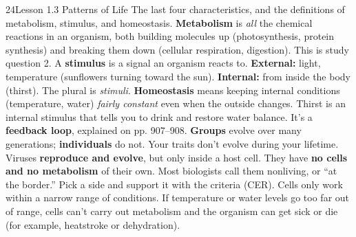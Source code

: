 \documentclass[11pt,letterpaper]{article}
\begin{document}
\begin{tbpage}{24}{Lesson 1.3 Patterns of Life}
  {The last four characteristics, and the definitions of metabolism, stimulus, and homeostasis.}
    {\textbf{Metabolism} is \emph{all} the chemical reactions in an organism, both building molecules up (photosynthesis, protein synthesis) and breaking them down (cellular respiration, digestion). This is study question 2.}
    {A \textbf{stimulus} is a signal an organism reacts to. \textbf{External:} light, temperature (sunflowers turning toward the sun). \textbf{Internal:} from inside the body (thirst). The plural is \emph{stimuli}.}
    {\textbf{Homeostasis} means keeping internal conditions (temperature, water) \emph{fairly constant} even when the outside changes. Thirst is an internal stimulus that tells you to drink and restore water balance. It's a \textbf{feedback loop}, explained on pp. 907–908.}
    {\textbf{Groups} evolve over many generations; \textbf{individuals} do not. Your traits don't evolve during your lifetime.}
    {Viruses \textbf{reproduce and evolve}, but only inside a host cell. They have \textbf{no cells and no metabolism} of their own. Most biologists call them nonliving, or ``at the border.'' Pick a side and support it with the criteria (CER).}
    {Cells only work within a narrow range of conditions. If temperature or water levels go too far out of range, cells can't carry out metabolism and the organism can get sick or die (for example, heatstroke or dehydration).}
\end{tbpage}
\end{document}

